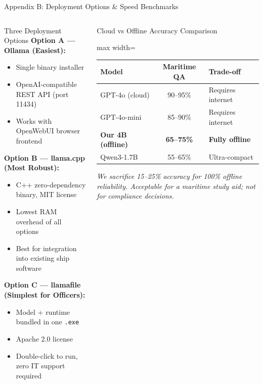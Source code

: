 \documentclass[aspectratio=169,11pt]{beamer}
\begin{document}
\begin{frame}[shrink=15]{Appendix B: Deployment Options \& Speed Benchmarks}
\begin{columns}[T]

\begin{block}{Three Deployment Options}
  \scriptsize\RaggedRight
  \textbf{Option A --- Ollama (Easiest):}
  \begin{itemize}\setlength\itemsep{1pt}
    \item Single binary installer
    \item OpenAI-compatible REST API (port 11434)
    \item Works with OpenWebUI browser frontend
  \end{itemize}
  \vspace{4pt}
  \textbf{Option B --- llama.cpp (Most Robust):}
  \begin{itemize}\setlength\itemsep{1pt}
    \item C++ zero-dependency binary, MIT license
    \item Lowest RAM overhead of all options
    \item Best for integration into existing ship software
  \end{itemize}
  \vspace{4pt}
  \textbf{Option C --- llamafile (Simplest for Officers):}
  \begin{itemize}\setlength\itemsep{1pt}
    \item Model + runtime bundled in one \texttt{.exe}
    \item Apache 2.0 license
    \item Double-click to run, zero IT support required
  \end{itemize}
\end{block}


\begin{block}{Cloud vs Offline Accuracy Comparison}
  \scriptsize
  \begin{adjustbox}{max width=\linewidth}
  \begin{tabular}{@{}lcl@{}}
    \toprule
    \textbf{Model} & \textbf{Maritime QA} & \textbf{Trade-off}\\
    \midrule
    GPT-4o (cloud) & 90--95\% & Requires internet\\
    GPT-4o-mini & 85--90\% & Requires internet\\
    \textbf{Our 4B (offline)} & \textbf{65--75\%} & \textbf{Fully offline}\\
    Qwen3-1.7B & 55--65\% & Ultra-compact\\
    \bottomrule
  \end{tabular}
  \end{adjustbox}
  \vspace{3pt}
  \emph{We sacrifice 15--25\% accuracy for 100\% offline reliability.
  Acceptable for a maritime study aid; not for compliance decisions.}
\end{block}


\end{columns}
\end{frame}
\end{document}
